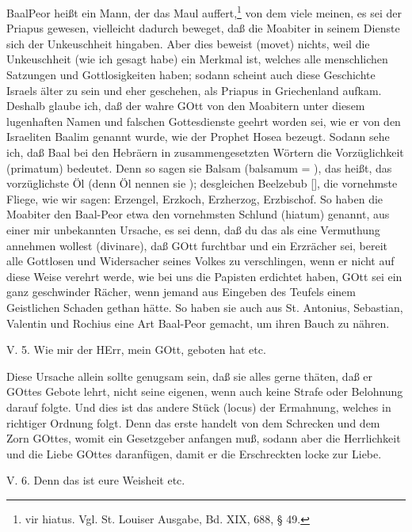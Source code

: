 BaalPeor heißt ein Mann, der das Maul
auffert,\footnote{vir hiatus. Vgl. St. Louiser Ausgabe, Bd. XIX, 688, § 49.} von dem viele meinen, es sei der Priapus gewesen, vielleicht dadurch beweget, daß die Moabiter in seinem Dienste sich der Unkeuschheit hingaben. Aber dies beweist (movet) nichts, weil die Unkeuschheit (wie ich gesagt habe) ein Merkmal ist, welches alle menschlichen Satzungen und Gottlosigkeiten haben; sodann scheint auch diese Geschichte Israels älter zu sein und eher geschehen, als Priapus in Griechenland aufkam. Deshalb glaube ich, daß der wahre GOtt von den Moabitern unter diesem lugenhaften Namen und falschen Gottesdienste geehrt worden sei, wie er von den Israeliten Baalim genannt wurde, wie der Prophet Hosea bezeugt. Sodann sehe ich, daß Baal bei den Hebräern in zusammengesetzten Wörtern die Vorzüglichkeit (primatum) bedeutet. Denn so sagen sie Balsam (balsamum = ), das heißt, das vorzüglichste Öl (denn Öl nennen sie ); desgleichen Beelzebub [], die vornehmste Fliege, wie wir sagen: Erzengel, Erzkoch, Erzherzog, Erzbischof. So haben die Moabiter den Baal-Peor etwa den vornehmsten Schlund (hiatum) genannt, aus einer mir unbekannten Ursache, es sei denn, daß du das als eine Vermuthung annehmen wollest (divinare), daß GOtt furchtbar und ein Erzrächer sei, bereit alle Gottlosen und Widersacher seines Volkes zu verschlingen, wenn er nicht auf diese Weise verehrt werde, wie bei uns die Papisten erdichtet haben, GOtt sei ein ganz geschwinder Rächer, wenn jemand aus Eingeben des Teufels einem Geistlichen Schaden gethan hätte. So haben sie auch aus St. Antonius, Sebastian, Valentin und Rochius eine Art Baal-Peor gemacht, um ihren Bauch zu nähren.

\begin{schriftzitat}
V. 5. Wie mir der HErr, mein GOtt, geboten hat etc.
\end{schriftzitat}

Diese Ursache allein sollte genugsam sein, daß sie alles gerne thäten, daß er GOttes Gebote lehrt, nicht seine eigenen, wenn auch keine Strafe oder Belohnung darauf folgte. Und dies ist das andere Stück (locus) der Ermahnung, welches in richtiger Ordnung folgt. Denn das erste handelt von dem Schrecken und dem Zorn GOttes, womit ein Gesetzgeber anfangen muß, sodann aber die Herrlichkeit und die Liebe GOttes daranfügen, damit er die Erschreckten locke zur Liebe.

\begin{schriftzitat}
V. 6. Denn das ist eure Weisheit etc.
\end{schriftzitat}

